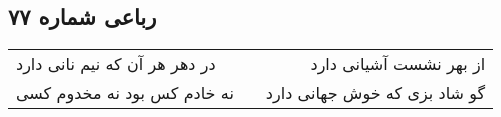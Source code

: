 \begin{center}
\section*{رباعی شماره ۷۷}
\label{sec:sh077}
\begin{longtable}{l p{0.5cm} r}
در دهر هر آن که نیم نانی دارد
&&
از بهر نشست آشیانی دارد
\\
نه خادم کس بود نه مخدوم کسی
&&
گو شاد بزی که خوش جهانی دارد
\\
\end{longtable}
\end{center}
